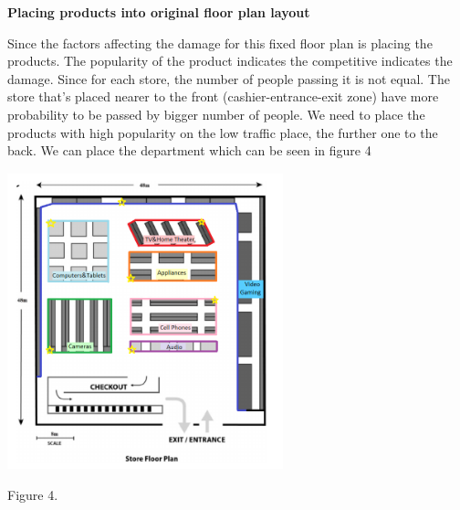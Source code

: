 \textbf{Placing products into original floor plan layout}
\newline
\par Since the factors affecting the damage for this fixed floor plan is placing the products. The popularity of the product indicates the competitive indicates the damage. Since for each store, the number of people passing it is not equal. The store that's placed nearer to the front (cashier-entrance-exit zone) have more probability to be passed by bigger number of people. We need to place the products with high popularity on the low traffic place, the further one to the back. We can place the department which can be seen in figure 4 
\newline

\begin{center}
\includegraphics[width=0.6\textwidth]{fig4.4.PNG} 
\end{center}
\begin{center}
Figure 4.
\end{center}

